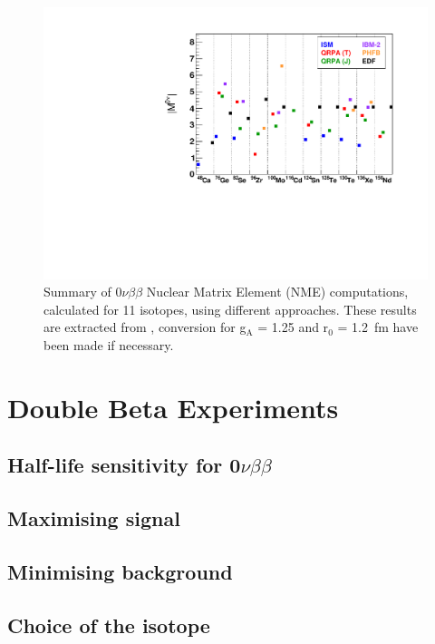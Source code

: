 \documentclass[main.tex]{subfiles}
\begin{document}
\begin{figure}[h!]
\begin{center}
\includegraphics[scale=0.70]{pictures/Chap2/NMEvalue.pdf}
\caption{Summary of 0$\nu\beta\beta$ Nuclear Matrix Element (NME) computations, calculated for 11 isotopes, using different approaches. These results are extracted from \cite{TheoryOfNeutrinolessDBD}, conversion for g$_{\text{A}}$ = 1.25 and r$_{\text{0}}$  = 1.2~fm have been made if necessary.}
\label{NME}
\end{center}
\end{figure}


\FloatBarrier


\section{Double Beta Experiments}\label{sec:DBDexperiment}

\subsection{Half-life sensitivity for 0$\nu\beta\beta$}

\subsection{Maximising signal}

\subsection{Minimising background}

\subsection{Choice of the isotope}
\end{document}
